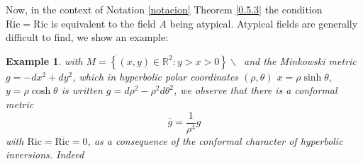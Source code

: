 \documentclass{amsart}%
\theoremstyle{plain}
\newtheorem{example}{Example}
\numberwithin{equation}{section}
\begin{document}
Now, in the context of Notation \ref{notacion} Theorem \ref{0.5.3} the
condition $\overline{\mathrm{Ric}}=\mathrm{Ric}$ is equivalent to the field
$A$ being atypical. Atypical fields are generally difficult to find, we show
an example:

\begin{example}
\label{Ex1}with $M=\left\{  \left(  x,y\right)  \in\mathbb{R}^{2}%
:y>x>0\right\}  \backslash\ $ and the Minkowski metric $g=-dx^{2}+dy^{2}$,
which in hyperbolic polar coordinates $\left(  \rho,\theta\right)  $
$x=\rho\sinh\theta,$ $y=\rho\cosh\theta$ is written $g=d\rho^{2}-\rho
^{2}d\theta^{2}$, we observe that there is a conformal metric
\[
\overline{g}=\frac{1}{\rho^{4}}g
\]
with $\mathrm{Ric}=\overline{\mathrm{Ric}}=0$, as a consequence of the
conformal character of hyperbolic inversions. Indeed


\end{example}
\end{document}
